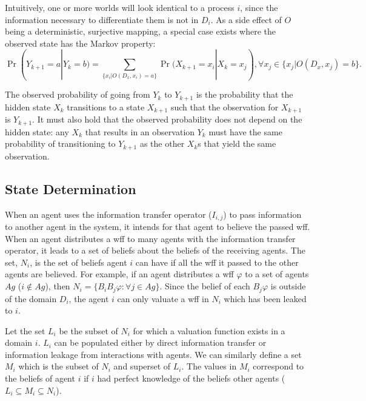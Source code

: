 Intuitively, one or more worlds will look identical to a process $i$, since the information necessary to differentiate them is not in $D_i$.
As a side effect of $O$ being a deterministic, surjective mapping, a special case exists where the observed state has the Markov property:
\begin{equation}
    \Pr(Y_{k+1}=a | Y_{k}=b) = \sum_{\{x_i | O(D_x, x_i) = a\}} \Pr(X_{k+1}=x_i | X_{k}=x_j), \forall x_j \in \{x_j | O(D_x, x_j) = b\}.
\label{eq:hidden-to-chain}
\end{equation}

The observed probability of going from $Y_k$ to $Y_{k+1}$ is the probability that the hidden state $X_k$ transitions to a state $X_{k+1}$ such that the observation for $X_{k+1}$ is $Y_{k+1}$.
It must also hold that the observed probability does not depend on the hidden state: any $X_k$ that results in an observation $Y_k$ must have the same probability of transitioning to $Y_{k+1}$ as the other $X_{k}$s that yield the same observation.

\subsection{State Determination}

When an agent uses the information transfer operator ($I_{i,j}$) to pass information to another agent in the system, it intends for that agent to believe the passed wff.
When an agent distributes a wff to many agents with the information transfer operator, it leads to a set of beliefs about the beliefs of the receiving agents.
The set, $N_i$, is the set of beliefs agent $i$ can have if all the wff it passed to the other agents are believed.
For example, if an agent distributes a wff $\varphi$ to a set of agents $Ag$ ($i \not \in Ag$), then $N_i = \{ B_i B_j \varphi : \forall j \in Ag \}$.
Since the belief of each $B_j \varphi$ is outside of the domain $D_i$, the agent $i$ can only valuate a wff in $N_i$ which has been leaked to $i$.

Let the set $L_i$ be the subset of $N_i$ for which a valuation function exists in a domain $i$.
$L_i$ can be populated either by direct information transfer or information leakage from interactions with agents.
We can similarly define a set $M_i$ which is the subset of $N_i$ and superset of $L_i$.
The values in $M_i$ correspond to the beliefs of agent $i$ if $i$ had perfect knowledge of the beliefs other agents ($L_i \subseteq M_i \subseteq N_i$).

